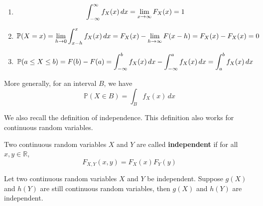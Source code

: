 \documentclass{huhtakm-template-book}
\newcommand{\prob}{\mathbb{P}}
\begin{document}
\begin{proofing}
	\begin{enumerate}
		\item 
		\begin{equation*}
			\int_{-\infty}^{\infty} f_{X}(x)\,dx=\lim_{x\to\infty}F_{X}(x)=1
		\end{equation*}
		\item
		\begin{equation*}
			\prob(X=x)=\lim_{h\to 0}\intlu{x-h}{x}f_{X}(x)\,dx=F_{X}(x)-\lim_{h\to\infty}F(x-h)=F_{X}(x)-F_{X}(x)=0
		\end{equation*}
		\item
		\begin{equation*}
			\prob(a\leq X\leq b)=F(b)-F(a)=\intlu{-\infty}{b}f_{X}(x)\,dx-\intlu{-\infty}{a}f_{X}(x)\,dx=\intlu{a}{b}f_{X}(x)\,dx
		\end{equation*}
	\end{enumerate}
\end{proofing}
\begin{rem}
	More generally, for an interval $B$, we have
	\begin{equation*}
		\prob(X\in B)=\int_{B}f_{X}(x)\,dx
	\end{equation*}
\end{rem}

\newpage
We also recall the definition of independence. This definition also works for continuous random variables.
\begin{defn}
	Two continuous random variables $X$ and $Y$ are called \textbf{independent} if for all $x,y\in\mathbb{R}$,
	\begin{equation*}
		F_{X,Y}(x,y)=F_{X}(x)F_{Y}(y)
	\end{equation*}
\end{defn}
\begin{thm}
	Let two continuous random variables $X$ and $Y$ be independent. Suppose $g(X)$ and $h(Y)$ are still continuous random variables, then $g(X)$ and $h(Y)$ are independent.
\end{thm}
\end{document}
